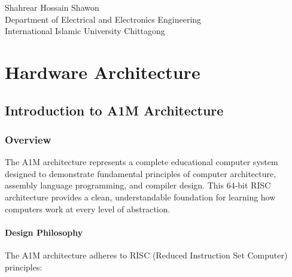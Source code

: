 \documentclass[12pt,a4paper,oneside]{book}
\begin{document}
\vspace{1cm}

\noindent
Shahrear Hossain Shawon\\
Department of Electrical and Electronics Engineering\\
International Islamic University Chittagong

\setcounter{tocdepth}{3}  %
\setcounter{secnumdepth}{3}  %
\tableofcontents
\newpage

\listoffigures
\newpage

\listoftables
\newpage

\lstlistoflistings
\newpage

\part{Hardware Architecture}

\chapter{Introduction to A1M Architecture}

\section{Overview}

The A1M architecture represents a complete educational computer system designed to demonstrate fundamental principles of computer architecture, assembly language programming, and compiler design. This 64-bit RISC architecture provides a clean, understandable foundation for learning how computers work at every level of abstraction.

\subsection{Design Philosophy}

The A1M architecture adheres to RISC (Reduced Instruction Set Computer) principles:
\end{document}
